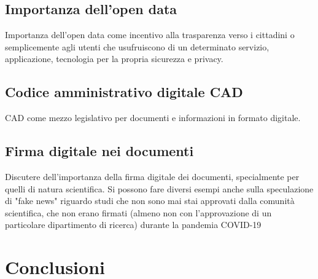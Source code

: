 \documentclass{article}
\begin{document}
\subsection{Importanza dell'open data}
Importanza dell'open data come incentivo alla trasparenza verso i cittadini o semplicemente agli utenti che usufruiscono di un determinato servizio, applicazione, tecnologia per la propria sicurezza e privacy. 
\subsection{Codice amministrativo digitale CAD}
CAD come mezzo legislativo per documenti e informazioni in formato digitale.
\subsection{Firma digitale nei documenti}
Discutere dell'importanza della firma digitale dei documenti, specialmente per quelli di natura scientifica.
Si possono fare diversi esempi anche sulla speculazione di "fake news" riguardo studi che non sono mai stai approvati dalla comunità scientifica, che non erano firmati (almeno non con l'approvazione di un particolare dipartimento di ricerca) durante la pandemia COVID-19
\section{Conclusioni}
\end{document}
